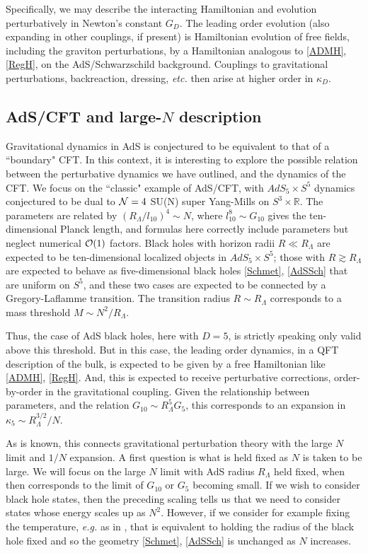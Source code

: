 \documentclass[12pt]{article}
\numberwithin{equation}{section}
\newcommand{\calo}{{\cal O}}
\begin{document}
Specifically, we may describe the interacting Hamiltonian and evolution perturbatively in Newton's constant $G_D$.  The leading order evolution (also expanding in other couplings, if present) is Hamiltonian evolution of free fields, including the graviton perturbations, by a Hamiltonian analogous to \eqref{ADMH},  \eqref{RegH}, on the AdS/Schwarzschild background.  Couplings to gravitational perturbations, backreaction, dressing, {\it etc.} then arise at higher order in $\kappa_D$.

\subsection{AdS/CFT and large-$N$ description}

Gravitational dynamics in AdS is conjectured to be equivalent to that of a ``boundary"  CFT\cite{Mald}.  In this context, it is interesting to explore the possible relation between the perturbative dynamics we have outlined, and the dynamics of the CFT.  We focus on the ``classic" example of AdS/CFT, with $AdS_5\times S^5$ dynamics conjectured to be dual to ${\cal N}=4$ SU(N) super Yang-Mills on $S^3\times \mathbb{R}$.  The parameters are related by $(R_\Lambda/l_{10})^4 \sim  N$, where  $l_{10}^8 \sim G_{10}$ gives the ten-dimensional Planck length, and formulas here correctly include parameters but neglect numerical $\calo(1)$ factors.  Black holes with horizon radii $R\ll R_\Lambda$ are expected to be ten-dimensional localized objects in $AdS_5\times S^5$; those with $R\gtrsim R_\Lambda$ are expected to behave as five-dimensional black holes \eqref{Schmet}, \eqref{AdSSch} that are uniform on $S^5$, and these two cases are expected to be connected by a Gregory-Laflamme transition\cite{GrLa}.  The transition radius $R\sim R_\Lambda$ corresponds to a mass threshold $M\sim N^2/R_\Lambda$.  

Thus, the case of AdS black holes, here with $D=5$, is strictly speaking only valid above this threshold.  But in this case, the leading order dynamics, in a QFT description of the bulk, is expected to be given by a free Hamiltonian like \eqref{ADMH},  \eqref{RegH}.  And, this is expected to receive perturbative corrections, order-by-order in the gravitational coupling.  Given the relationship between parameters, and the relation $G_{10}\sim R_\Lambda^5 G_5$, this corresponds to an expansion in $\kappa_5\sim R^{3/2}_\Lambda/N$.  

As is known, this connects gravitational perturbation theory with the large $N$ limit and $1/N$ expansion.  A first question is what is held fixed as $N$ is taken to be large.  We will focus on the large $N$ limit with AdS radius $R_\Lambda$ held fixed, when then corresponds to the limit of $G_{10}$ or $G_5$ becoming small.  If we wish to consider black hole states, then the preceding scaling tells us that we need to consider states whose energy scales up as $N^2$.  However, if we consider for example fixing the temperature, {\it e.g.} as in \cite{ScWi}, that is equivalent to holding the radius of the black hole fixed and so the geometry  \eqref{Schmet}, \eqref{AdSSch} is unchanged as $N$ increases.
\end{document}
